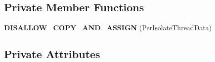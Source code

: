 \subsection*{Private Member Functions}
\begin{DoxyCompactItemize}
\item 
{\bfseries D\+I\+S\+A\+L\+L\+O\+W\+\_\+\+C\+O\+P\+Y\+\_\+\+A\+N\+D\+\_\+\+A\+S\+S\+I\+GN} (\hyperlink{classv8_1_1internal_1_1_isolate_1_1_per_isolate_thread_data}{Per\+Isolate\+Thread\+Data})\hypertarget{classv8_1_1internal_1_1_isolate_1_1_per_isolate_thread_data_a34ab7ba884573f582b9201b6beded2f0}{}\label{classv8_1_1internal_1_1_isolate_1_1_per_isolate_thread_data_a34ab7ba884573f582b9201b6beded2f0}

\end{DoxyCompactItemize}
\subsection*{Private Attributes}
